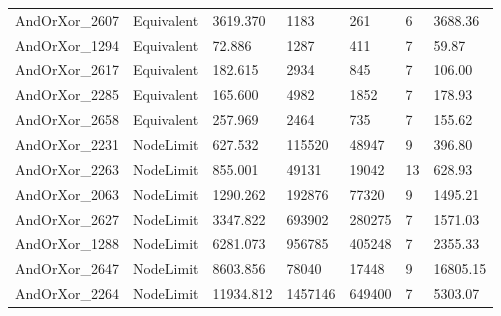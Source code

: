 \begin{tabular}{lllllll}
AndOrXor\_2607 & Equivalent & 3619.370 & 1183 & 261 & 6 & 3688.36 \\
AndOrXor\_1294 & Equivalent & 72.886 & 1287 & 411 & 7 & 59.87 \\
AndOrXor\_2617 & Equivalent & 182.615 & 2934 & 845 & 7 & 106.00 \\
AndOrXor\_2285 & Equivalent & 165.600 & 4982 & 1852 & 7 & 178.93 \\
AndOrXor\_2658 & Equivalent & 257.969 & 2464 & 735 & 7 & 155.62 \\
AndOrXor\_2231 & NodeLimit & 627.532 & 115520 & 48947 & 9 & 396.80 \\
AndOrXor\_2263 & NodeLimit & 855.001 & 49131 & 19042 & 13 & 628.93 \\
AndOrXor\_2063 & NodeLimit & 1290.262 & 192876 & 77320 & 9 & 1495.21 \\
AndOrXor\_2627 & NodeLimit & 3347.822 & 693902 & 280275 & 7 & 1571.03 \\
AndOrXor\_1288 & NodeLimit & 6281.073 & 956785 & 405248 & 7 & 2355.33 \\
AndOrXor\_2647 & NodeLimit & 8603.856 & 78040 & 17448 & 9 & 16805.15 \\
AndOrXor\_2264 & NodeLimit & 11934.812 & 1457146 & 649400 & 7 & 5303.07 \\
\bottomrule
\end{tabular}
